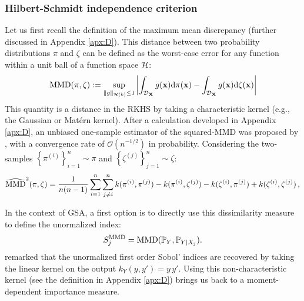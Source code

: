 \subsubsection{Hilbert-Schmidt independence criterion}

Let us first recall the definition of the maximum mean discrepancy (further discussed in Appendix \ref{apx:D}). 
This distance between two probability distributions $\pi$ and $\zeta$ can be defined as the worst-case error for any function within a unit ball of a function space $\mathcal{H}$:
\begin{equation}
    \mathrm{MMD}(\pi, \zeta) := \sup_{\lVert g \lVert_{\mathcal{H}(k)} \leq 1} \left | \int_{\mathcal{D}_{{\bf X}}} g({\bf x}) \mathrm{d} \pi({\bf x}) - \int_{\mathcal{D}_{{\bf X}}} g({\bf x}) \mathrm{d} \zeta({\bf x}) \right| 
    \label{eq:mmd_chapter1}  
\end{equation}
This quantity is a distance in the RKHS by taking a characteristic kernel (e.g., the Gaussian or Matérn kernel). 
After a calculation developed in Appendix \ref{apx:D}, an unbiased one-sample estimator of the squared-MMD was proposed by \citet{gretton_2006}, 
with a convergence rate of $\mathcal{O}(n^{-1/2})$ in probability. 
Considering the two-samples $\left\{\pi^{(i)}\right\}_{i=1}^n \sim \pi$ and $\left\{\zeta^{(j)}\right\}_{j=1}^n \sim \zeta$: 
\begin{equation}
    \widehat{\mathrm{MMD}}^2(\pi, \zeta) = \frac{1}{n (n-1)} \sum_{i=1}^{n} \sum_{j \neq i}^{n} 
                                k(\pi^{(i)}, \pi^{(j)}) - k(\pi^{(i)}, \zeta^{(j)}) - k(\zeta^{(i)}, \pi^{(j)}) + k(\zeta^{(i)}, \zeta^{(j)}) \, , 
\label{eq:mmd_ustat}
\end{equation}

In the context of GSA, a first option is to directly use this dissimilarity measure to define the unormalized index: 
\begin{equation}
    S_j^{\mathrm{MMD}} = \mathrm{MMD}(\mathbb{P}_Y, \mathbb{P}_{Y |X_j}). 
    \label{eq:mmd_gsa}
\end{equation}
\citet{daveiga_2021_kernel_ANOVA} remarked that the unormalized first order Sobol' indices are recovered by taking the linear kernel on the output $k_{Y}(y, y')=y\, y'$. 
Using this non-characteristic kernel (see the definition in Appendix \ref{apx:D}) brings us back to a moment-dependent importance measure. 

